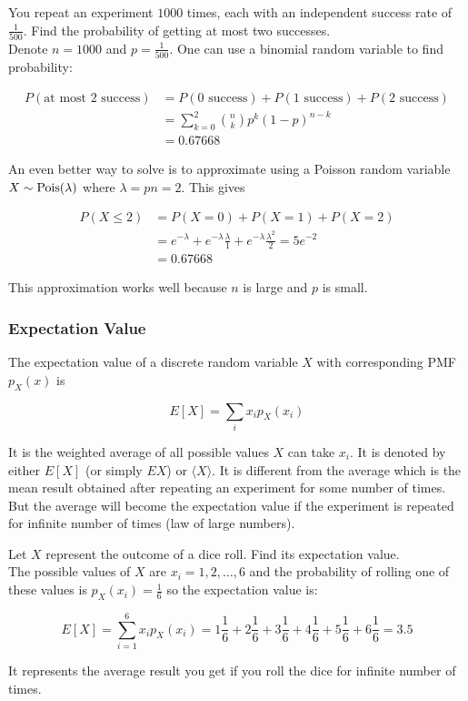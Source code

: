 \begin{texample}
	You repeat an experiment $1000$ times, each with an independent success rate of $\frac{1}{500}$. Find the probability of getting at most two successes. \\
	
	Denote $n=1000$ and $p=\frac{1}{500}$. One can use a binomial random variable to find probability:
	
	\begin{align*}
		P(\text{at most 2 success}) &= P(\text{0 success})+P(\text{1 success})+P(\text{2 success}) \\
		&= \sum_{k=0}^2 {n\choose k} p^k (1-p)^{n-k} \\
		&= 0.67668
	\end{align*}
	
	An even better way to solve is to approximate using a Poisson random variable $X\sim\operatorname{Pois}(\lambda)$ where $\lambda=pn=2$. This gives
	
	\begin{align*}
		P(X \le 2)&=P(X=0)+P(X=1)+P(X=2) \\
		&=e^{-\lambda}+e^{-\lambda}\frac{\lambda}{1}+e^{-\lambda}\frac{\lambda^2}{2}=5e^{-2} \\
		&=0.67668
	\end{align*}
	
	This approximation works well because $n$ is large and $p$ is small.
\end{texample}

\subsubsection{Expectation Value}

The expectation value of a discrete random variable $X$ with corresponding PMF $p_X(x)$ is

$$E[X]=\sum_i x_i p_X(x_i)$$

It is the weighted average of all possible values $X$ can take $x_i$. It is denoted by either $E[X]$ (or simply $EX$) or $\langle X \rangle$. It is different from the average which is the mean result obtained after repeating an experiment for some number of times. But the average will become the expectation value if the experiment is repeated for infinite number of times (law of large numbers).

\begin{texample}
	Let $X$ represent the outcome of a dice roll. Find its expectation value. \\
	
	The possible values of $X$ are $x_i=1, 2, \dots, 6$ and the probability of rolling one of these values is $p_X(x_i)=\frac16$ so the expectation value is:
	
	$$E[X]=\sum_{i=1}^6 x_i p_X(x_i)=1\frac16+2\frac16+3\frac16+4\frac16+5\frac16+6\frac16=3.5$$
	
	It represents the average result you get if you roll the dice for infinite number of times.
\end{texample}

